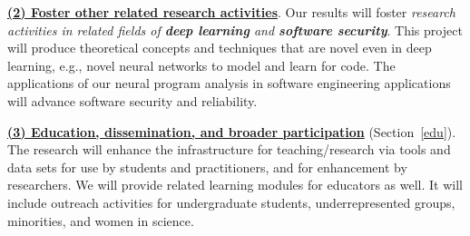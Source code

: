 \noindent\underline{{\bf (2) Foster other related research
    activities}}. Our results will foster {\em research activities in
  related fields of {\bf deep learning} and {\bf software
    security}}. This project will produce theoretical concepts and
techniques that are novel even in deep learning, e.g., novel neural
networks to model and learn for code. The applications of our neural
program analysis in software engineering applications will advance
software security and reliability.



\noindent\underline{{\bf (3) Education, dissemination, and broader participation}} (Section~\ref{edu}). The
research will enhance the infrastructure for teaching/research via
tools and data sets for use by students and practitioners, and for
enhancement by researchers. We will provide related learning
modules for educators as well. It will include outreach activities for
undergraduate students, underrepresented groups, minorities, and women
in science.


